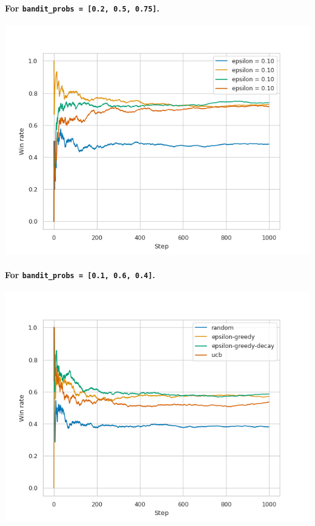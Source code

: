 \documentclass[12pt]{article}
\begin{document}
\paragraph{For \texttt{bandit\_probs = [0.2, 0.5, 0.75]}.}
\begin{solution}
\includegraphics[width = \textwidth]{hw/HW1/bandit_4d1.png}
\end{solution}

\paragraph{For \texttt{bandit\_probs = [0.1, 0.6, 0.4]}.}
\begin{solution}
\includegraphics[width = \textwidth]{hw/HW1/bandit_4d2.png}
\end{solution}
\end{document}
